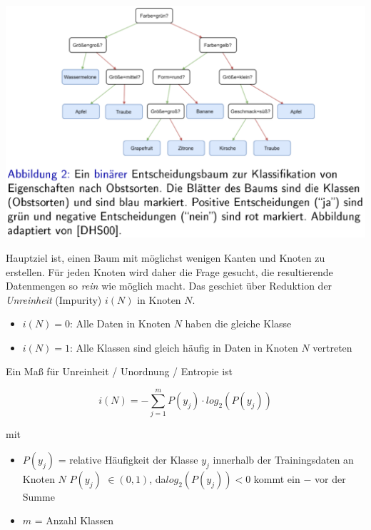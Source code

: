 \documentclass{report}
\begin{document}
\begin{center}
  \includegraphics[scale=.325]{ml07_2}
\end{center}

Hauptziel ist, einen Baum mit möglichst wenigen Kanten und Knoten zu erstellen. Für jeden Knoten wird daher die Frage gesucht,
die resultierende Datenmengen so \textit{rein} wie möglich macht. Das geschiet über Reduktion der \textit{Unreinheit} (Impurity)
$i(N)$ in Knoten $N$.\\
\vspace*{-1.5em}
\begin{itemize}
  \item $i(N) = 0$: Alle Daten in Knoten $N$ haben die gleiche Klasse
  \item $i(N) = 1$: Alle Klassen sind gleich häufig in Daten in Knoten $N$ vertreten
\end{itemize}

Ein Maß für Unreinheit / Unordnung / Entropie ist

$$i(N) = -\sum_{j=1}^mP(y_j)\cdot log_2(P(y_j))$$

mit\\
\vspace*{-1.5em}
\begin{itemize}
  \item $P(y_j)$ = relative Häufigkeit der Klasse $y_j$ innerhalb der Trainingsdaten an Knoten $N$
  \subitem $P(y_j)$ $\in (0, 1)$, da$log_2(P(y_j)) < 0$ kommt ein $-$ vor der Summe
  \item $m$ = Anzahl Klassen
\end{itemize}
\end{document}

